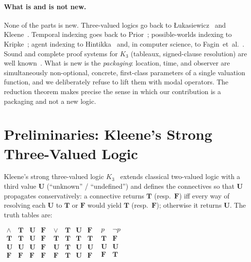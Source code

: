 \documentclass[11pt,a4paper]{article}
\theoremstyle{definition}
\theoremstyle{plain}
\theoremstyle{remark}
\newcommand{\Tv}{\mathbf{T}}
\newcommand{\Fv}{\mathbf{F}}
\newcommand{\Uv}{\mathbf{U}}
\begin{document}
\paragraph{What is and is not new.}
None of the parts is new. Three-valued logics go back to
{\L}ukasiewicz~\cite{lukasiewicz1920} and Kleene~\cite{kleene1952}.
Temporal indexing goes back to Prior~\cite{prior1957}; possible-worlds
indexing to Kripke~\cite{kripke1963}; agent indexing to
Hintikka~\cite{hintikka1962} and, in computer science, to
Fagin~et~al.~\cite{fagin1995}. Sound and complete proof systems for $K_3$
(tableaux, signed-clause resolution) are well known~\cite{hahnle1993}.
What is new is the \emph{packaging}: location, time, and observer are
simultaneously non-optional, concrete, first-class parameters of a single
valuation function, and we deliberately refuse to lift them with modal
operators. The reduction theorem makes precise the sense in which our
contribution is a packaging and not a new logic.

\section{Preliminaries: Kleene's Strong Three-Valued Logic}
\label{sec:prelim}

Kleene's strong three-valued logic $K_3$~\cite{kleene1952} extends classical
two-valued logic with a third value $\Uv$ (``unknown'' / ``undefined'') and
defines the connectives so that $\Uv$ propagates conservatively: a
connective returns $\Tv$ (resp.\ $\Fv$) iff every way of resolving each
$\Uv$ to $\Tv$ or $\Fv$ would yield $\Tv$ (resp.\ $\Fv$); otherwise it
returns $\Uv$. The truth tables are:

\begin{center}
$\begin{array}{c|ccc}
\land & \Tv & \Uv & \Fv \\ \hline
\Tv & \Tv & \Uv & \Fv \\
\Uv & \Uv & \Uv & \Fv \\
\Fv & \Fv & \Fv & \Fv
\end{array}$\qquad
$\begin{array}{c|ccc}
\lor & \Tv & \Uv & \Fv \\ \hline
\Tv & \Tv & \Tv & \Tv \\
\Uv & \Tv & \Uv & \Uv \\
\Fv & \Tv & \Uv & \Fv
\end{array}$\qquad
$\begin{array}{c|c}
p & \lnot p \\ \hline
\Tv & \Fv \\
\Uv & \Uv \\
\Fv & \Tv
\end{array}$
\end{center}
\end{document}
